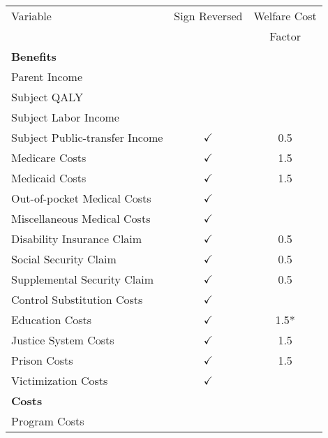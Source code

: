 \begin{tabular}{l c c}
\toprule			
Variable & Sign Reversed	& Welfare Cost \\
	&		& Factor \\
\midrule
\textbf{Benefits} 	\\			
\quad Parent Income			& \\
\quad Subject QALY			& \\
\quad Subject Labor Income	& \\
\quad Subject Public-transfer Income	& $\checkmark$	& 0.5 \\
\quad Medicare Costs			& $\checkmark$	& 1.5 \\
\quad Medicaid Costs			& $\checkmark$	& 1.5 \\
\quad Out-of-pocket Medical Costs	& $\checkmark$ \\
\quad Miscellaneous Medical Costs	& $\checkmark$ \\
\quad Disability Insurance Claim	& $\checkmark$	&	0.5 \\
\quad Social Security Claim	& $\checkmark$	&	0.5 \\
\quad Supplemental Security Claim	& $\checkmark$	&	0.5 \\
\quad Control Substitution Costs	& $\checkmark$	& \\
\quad Education Costs			& $\checkmark$	& 1.5* \\
\quad Justice System Costs	& $\checkmark$	& 1.5 \\
\quad Prison Costs			& $\checkmark$	& 1.5 \\
\quad Victimization Costs		& $\checkmark$	& \\
\textbf{Costs} 	\\			
\quad Program Costs			& \\
\bottomrule			
\end{tabular}